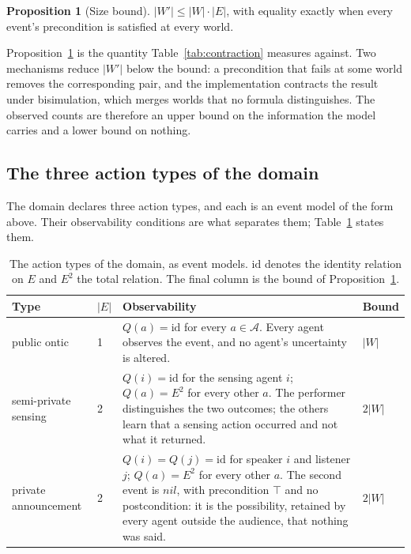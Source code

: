 \documentclass[11pt,a4paper]{article}
\theoremstyle{definition}
\newtheorem{proposition}{Proposition}
\newcommand{\Ag}{\mathcal{A}}
\begin{document}
\begin{proposition}[Size bound]
\label{prop:bound}
$|W'| \le |W| \cdot |E|$, with equality exactly when every event's
precondition is satisfied at every world.
\end{proposition}

Proposition~\ref{prop:bound} is the quantity Table~\ref{tab:contraction}
measures against. Two mechanisms reduce $|W'|$ below the bound: a precondition
that fails at some world removes the corresponding pair, and the implementation
contracts the result under bisimulation, which merges worlds that no formula
distinguishes. The observed counts are therefore an upper bound on the
information the model carries and a lower bound on nothing.

\subsection{The three action types of the domain}

The domain declares three action types, and each is an event model of the form
above. Their observability conditions are what separates them;
Table~\ref{tab:actiontypes} states them.

\begin{table}[H]
\centering\small
\caption{The action types of the domain, as event models. $\mathrm{id}$ denotes
the identity relation on $E$ and $E^2$ the total relation. The final column is
the bound of Proposition~\ref{prop:bound}.}
\label{tab:actiontypes}
\begin{tabularx}{\textwidth}{@{}llXl@{}}
\toprule
\textbf{Type} & $|E|$ & \textbf{Observability} & \textbf{Bound} \\
\midrule
public ontic
  & 1
  & $Q(a) = \mathrm{id}$ for every $a \in \Ag$. Every agent observes the event,
    and no agent's uncertainty is altered.
  & $|W|$ \\
\addlinespace
semi-private sensing
  & 2
  & $Q(i) = \mathrm{id}$ for the sensing agent $i$; $Q(a) = E^2$ for every
    other $a$. The performer distinguishes the two outcomes; the others learn
    that a sensing action occurred and not what it returned.
  & $2|W|$ \\
\addlinespace
private announcement
  & 2
  & $Q(i) = Q(j) = \mathrm{id}$ for speaker $i$ and listener $j$;
    $Q(a) = E^2$ for every other $a$. The second event is $\mathit{nil}$, with
    precondition $\top$ and no postcondition: it is the possibility, retained
    by every agent outside the audience, that nothing was said.
  & $2|W|$ \\
\bottomrule
\end{tabularx}
\end{table}
\end{document}
